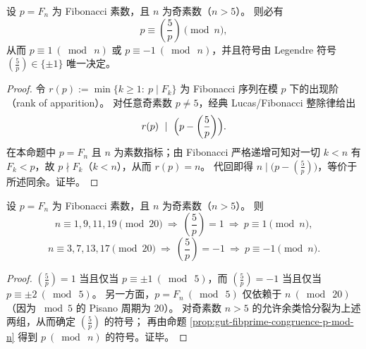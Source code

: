 \begin{proposition}\label{prop:gut-fibprime-congruence-p-mod-n}
设 \(p=F_n\) 为 Fibonacci 素数，且 \(n\) 为奇素数（\(n>5\)）。
则必有
\[
p \equiv \left(\frac{5}{p}\right)\pmod n,
\]
从而 \(p\equiv 1\ (\bmod\ n)\) 或 \(p\equiv -1\ (\bmod\ n)\)，并且符号由 Legendre 符号 \(\left(\frac{5}{p}\right)\in\{\pm 1\}\) 唯一决定。
\end{proposition}
\begin{proof}
令 \(r(p):=\min\{k\ge 1:\ p\mid F_k\}\) 为 Fibonacci 序列在模 \(p\) 下的出现阶（rank of apparition）。
对任意奇素数 \(p\neq 5\)，经典 Lucas/Fibonacci 整除律给出
\[
r(p)\ \mid\ \Bigl(p-\left(\frac{5}{p}\right)\Bigr).
\]
在本命题中 \(p=F_n\) 且 \(n\) 为素数指标；由 Fibonacci 严格递增可知对一切 \(k<n\) 有 \(F_k<p\)，故 \(p\nmid F_k\)（\(k<n\)），从而 \(r(p)=n\)。
代回即得 \(n\mid\bigl(p-(\frac{5}{p})\bigr)\)，等价于所述同余。证毕。
\end{proof}

\begin{corollary}\label{cor:gut-fibprime-sign-by-n-mod20}
设 \(p=F_n\) 为 Fibonacci 素数，且 \(n\) 为奇素数（\(n>5\)）。
则
\[
n\equiv 1,9,11,19\pmod{20}\ \Longrightarrow\ \left(\frac{5}{p}\right)=1\ \Longrightarrow\ p\equiv 1\pmod n,
\]
\[
n\equiv 3,7,13,17\pmod{20}\ \Longrightarrow\ \left(\frac{5}{p}\right)=-1\ \Longrightarrow\ p\equiv -1\pmod n.
\]
\end{corollary}
\begin{proof}
\(\left(\frac{5}{p}\right)=1\) 当且仅当 \(p\equiv \pm 1\ (\bmod\ 5)\)，而 \(\left(\frac{5}{p}\right)=-1\) 当且仅当 \(p\equiv \pm 2\ (\bmod\ 5)\)。
另一方面，\(p=F_n\ (\bmod\ 5)\) 仅依赖于 \(n\ (\bmod\ 20)\)（因为 \(\bmod 5\) 的 Pisano 周期为 \(20\)）。
对奇素数 \(n>5\) 的允许余类恰分裂为上述两组，从而确定 \(\left(\frac{5}{p}\right)\) 的符号；
再由命题 \ref{prop:gut-fibprime-congruence-p-mod-n} 得到 \(p\ (\bmod\ n)\) 的符号。证毕。
\end{proof}

